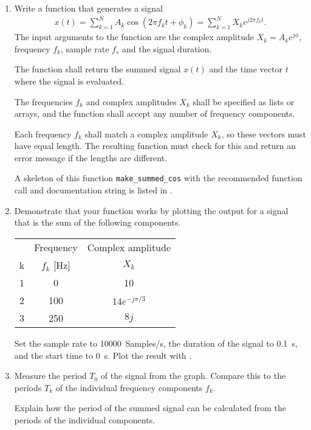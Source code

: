 \begin{enumerate}[1)]
\item Write a function that generates a signal
	\begin{align}
		x(t)= \sum_{k=1}^{N} A_k \cos(2\pi f_k t + \phi_k) =\sum_{k=1}^{N} X_k e^{j2\pi f_k t}.
	\end{align}
	The input arguments to the function are the complex amplitude $X_k=A_k e^{j\phi}$, frequency $f_k$, sample rate $f_s$ and the signal duration.
	
	The function shall return the summed signal $x(t)$ and the time vector $t$ where the signal is evaluated.
	
	The frequencies $f_k$ and complex amplitudes $X_k$ shall be specified as lists or \numpy arrays, and the function shall accept any number of frequency components. 
	
	Each frequency $f_k$ shall match a complex amplitude $X_k$, so these vectors must have equal length. The resulting function must check for this and return an error message if the lengths are different. 
	
	A skeleton of this function \verb|make_summed_cos| with the recommended function call and documentation string is listed in . 
		
	\item Demonstrate that your function works by plotting the output for a signal that is the sum of the following components.
	\begin{center}
		\begin{tabular}{ccc}
				&	Frequency	& Complex amplitude	\\
			k	&	$f_k$ [Hz]		& $X_k$  			\\
			\hline
			1	&	\num{0}		& \num{10}				\\
			2	&	\num{100}	& $14e^{-j\pi/3}$		\\
			3	&	\num{250}	& 	$8j$				\\
		\hline
		\end{tabular}
	\end{center}
	Set the sample rate to \qty{10000}{Samples/s}, the duration of the signal to \qty{0.1}{s}, and the start time to \qty{0}{s}. Plot the result with \matplotlib.
	
	\item Measure the period $T_0 $ of the signal from the graph. Compare this to the periods $T_k$ of the individual frequency components $f_k$.
	
	Explain how the period of the summed signal can be calculated from the periods of the individual components.
	

\end{enumerate}
